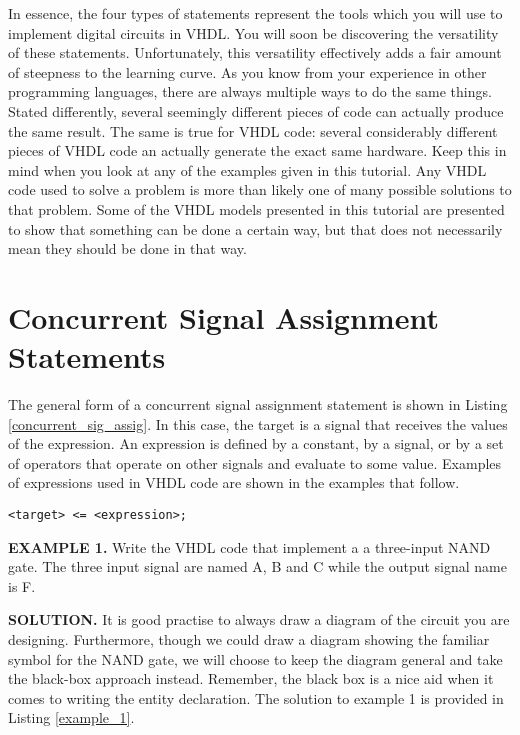 In essence, the four types of statements represent the tools which you will use to implement digital circuits in VHDL. You will soon be discovering the versatility of these statements. Unfortunately, this versatility effectively adds a fair amount of steepness to the learning curve. As you know from your experience in other programming languages, there are always multiple ways to do the same things. Stated differently, several seemingly different pieces of code can actually produce the same result. The same is true for VHDL code: several considerably different pieces of VHDL code an actually generate the exact same hardware. Keep this in mind when you look at any of the examples given in this tutorial. Any VHDL code used to solve a problem is more than likely one of many possible solutions to that problem. Some of the VHDL models presented in this tutorial are presented to show that something can be done a certain way, but that does not necessarily mean they should be done in that way.

\section{Concurrent Signal Assignment Statements}
The general form of a concurrent signal assignment statement is shown in Listing \ref{concurrent_sig_assig}. In this case, the target is a signal that receives the values of the expression. An expression is defined by a constant, by a signal, or by a set of operators that operate on other signals and evaluate to some value. Examples of expressions used in VHDL code are shown in the examples that follow.

\begin{lstlisting}[label=concurrent_sig_assig, caption=Syntax for the concurrent signal assignment statement.]
<target> <= <expression>;
\end{lstlisting}

\begin{leftbar}
\noindent
\textbf{EXAMPLE 1.}
Write the VHDL code that implement a a three-input NAND gate. The three input signal are named A, B and C while the output signal name is F. 
\end{leftbar}
\noindent
\textbf{SOLUTION.} It is good practise to always draw a diagram of the circuit you are designing. Furthermore, though we could draw a diagram showing the familiar symbol for the NAND gate, we will choose to keep the diagram general and take the black-box approach instead. Remember, the black box is a nice aid when it comes to writing the entity declaration. The solution to example 1 is provided in Listing \ref{example_1}.

